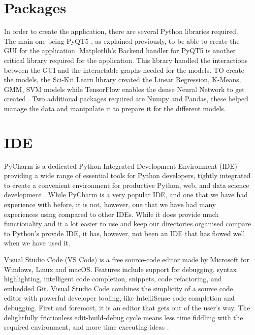 	
	\section{Packages}
	\label{sec:packages_used}
	
	In order to create the application, there are several Python libraries required. The main one being PyQT5 \cite{pyqt_rbc}, as explained previously, to be able to create the GUI for the application. Matplotlib's \cite{hunter2007matplotlib} Backend handler for PyQT5 is another critical library required for the application. This library handled the interactions between the GUI and the interactable graphs needed for the models. TO create the models, the Sci-Kit Learn library created the Linear Regression, K-Means, GMM, SVM models while TensorFlow enables the dense Neural Network to get created \cite{tensorflow2015-whitepaper}. Two additional packages required are Numpy \cite{walt2011numpy} and Pandas, these helped manage the data and manipulate it to prepare it for the different models.
	
	\section{IDE}
	\label{sec:ide_used}
	
	PyCharm is a dedicated Python Integrated Development Environment (IDE) providing a wide range of essential tools for Python developers, tightly integrated to create a convenient environment for productive Python, web, and data science development \cite{pycharm_get_started}. While PyCharm is a very popular IDE, and one that we have had experience with before, it is not, however, one that we have had many experiences using compared to other IDEs. While it does provide much functionality and it a lot easier to use and keep our directories organised compare to Python's provide IDE, it has, however, not been an IDE that has flowed well when we have used it.
	
	Visual Studio Code (VS Code) is a free source-code editor made by Microsoft for Windows, Linux and macOS. Features include support for debugging, syntax highlighting, intelligent code completion, snippets, code refactoring, and embedded Git. Visual Studio Code combines the simplicity of a source code editor with powerful developer tooling, like IntelliSense code completion and debugging. First and foremost, it is an editor that gets out of the user's way. The delightfully frictionless edit-build-debug cycle means less time fiddling with the required environment, and more time executing ideas \cite{vs_code}.
	
